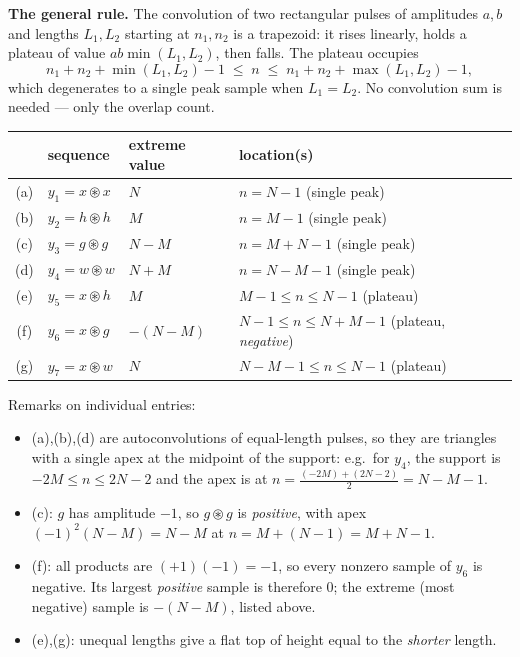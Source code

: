 \textbf{The general rule.} The convolution of two rectangular pulses of amplitudes $a,b$ and
lengths $L_1,L_2$ starting at $n_1,n_2$ is a trapezoid: it rises linearly, holds a plateau of
value $ab\min(L_1,L_2)$, then falls. The plateau occupies
\[
n_1+n_2+\min(L_1,L_2)-1 \;\le\; n \;\le\; n_1+n_2+\max(L_1,L_2)-1 ,
\]
which degenerates to a single peak sample when $L_1=L_2$. No convolution sum is needed ---
only the overlap count.

\begin{center}
\renewcommand{\arraystretch}{1.6}
\begin{tabular}{@{}cllll@{}}
\toprule
& sequence & extreme value & location(s)\\
\midrule
(a) & $y_1=x\circledast x$ & $N$ & $n=N-1$ (single peak)\\
(b) & $y_2=h\circledast h$ & $M$ & $n=M-1$ (single peak)\\
(c) & $y_3=g\circledast g$ & $N-M$ & $n=M+N-1$ (single peak)\\
(d) & $y_4=w\circledast w$ & $N+M$ & $n=N-M-1$ (single peak)\\
(e) & $y_5=x\circledast h$ & $M$ & $M-1\le n\le N-1$ (plateau)\\
(f) & $y_6=x\circledast g$ & $-(N-M)$ & $N-1\le n\le N+M-1$ (plateau, \emph{negative})\\
(g) & $y_7=x\circledast w$ & $N$ & $N-M-1\le n\le N-1$ (plateau)\\
\bottomrule
\end{tabular}
\end{center}

Remarks on individual entries:
\begin{itemize}[leftmargin=1.4em,itemsep=2pt]
\item (a),(b),(d) are autoconvolutions of equal-length pulses, so they are triangles with a
single apex at the midpoint of the support: e.g.\ for $y_4$, the support is
$-2M\le n\le 2N-2$ and the apex is at $n=\tfrac{(-2M)+(2N-2)}{2}=N-M-1$.
\item (c): $g$ has amplitude $-1$, so $g\circledast g$ is \emph{positive}, with apex
$(-1)^2(N-M)=N-M$ at $n=M+(N-1)=M+N-1$.
\item (f): all products are $(+1)(-1)=-1$, so every nonzero sample of $y_6$ is negative. Its
largest \emph{positive} sample is therefore $0$; the extreme (most negative) sample is
$-(N-M)$, listed above.
\item (e),(g): unequal lengths give a flat top of height equal to the \emph{shorter} length.
\end{itemize}


